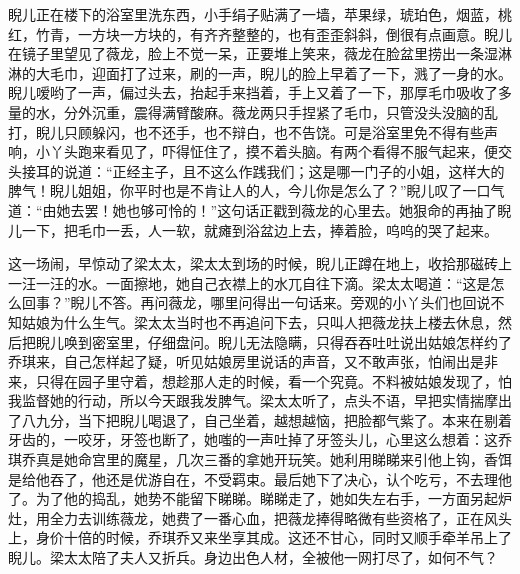 \par 睨儿正在楼下的浴室里洗东西，小手绢子贴满了一墙，苹果绿，琥珀色，烟蓝，桃红，竹青，一方块一方块的，有齐齐整整的，也有歪歪斜斜，倒很有点画意。睨儿在镜子里望见了薇龙，脸上不觉一呆，正要堆上笑来，薇龙在脸盆里捞出一条湿淋淋的大毛巾，迎面打了过来，刷的一声，睨儿的脸上早着了一下，溅了一身的水。睨儿嗳哟了一声，偏过头去，抬起手来挡着，手上又着了一下，那厚毛巾吸收了多量的水，分外沉重，震得满臂酸麻。薇龙两只手捏紧了毛巾，只管没头没脑的乱打，睨儿只顾躲闪，也不还手，也不辩白，也不告饶。可是浴室里免不得有些声响，小丫头跑来看见了，吓得怔住了，摸不着头脑。有两个看得不服气起来，便交头接耳的说道：“正经主子，且不这么作践我们；这是哪一门子的小姐，这样大的脾气！睨儿姐姐，你平时也是不肯让人的人，今儿你是怎么了？”睨儿叹了一口气道：“由她去罢！她也够可怜的！”这句话正戳到薇龙的心里去。她狠命的再抽了睨儿一下，把毛巾一丢，人一软，就瘫到浴盆边上去，捧着脸，呜呜的哭了起来。
\par 这一场闹，早惊动了梁太太，梁太太到场的时候，睨儿正蹲在地上，收拾那磁砖上一汪一汪的水。一面擦地，她自己衣襟上的水兀自往下滴。梁太太喝道：“这是怎么回事？”睨儿不答。再问薇龙，哪里问得出一句话来。旁观的小丫头们也回说不知姑娘为什么生气。梁太太当时也不再追问下去，只叫人把薇龙扶上楼去休息，然后把睨儿唤到密室里，仔细盘问。睨儿无法隐瞒，只得吞吞吐吐说出姑娘怎样约了乔琪来，自己怎样起了疑，听见姑娘房里说话的声音，又不敢声张，怕闹出是非来，只得在园子里守着，想趁那人走的时候，看一个究竟。不料被姑娘发现了，怕我监督她的行动，所以今天跟我发脾气。梁太太听了，点头不语，早把实情揣摩出了八九分，当下把睨儿喝退了，自己坐着，越想越恼，把脸都气紫了。本来在剔着牙齿的，一咬牙，牙签也断了，她嗤的一声吐掉了牙签头儿，心里这么想着：这乔琪乔真是她命宫里的魔星，几次三番的拿她开玩笑。她利用睇睇来引他上钩，香饵是给他吞了，他还是优游自在，不受羁束。最后她下了决心，认个吃亏，不去理他了。为了他的捣乱，她势不能留下睇睇。睇睇走了，她如失左右手，一方面另起炉灶，用全力去训练薇龙，她费了一番心血，把薇龙捧得略微有些资格了，正在风头上，身价十倍的时候，乔琪乔又来坐享其成。这还不甘心，同时又顺手牵羊吊上了睨儿。梁太太陪了夫人又折兵。身边出色人材，全被他一网打尽了，如何不气？
